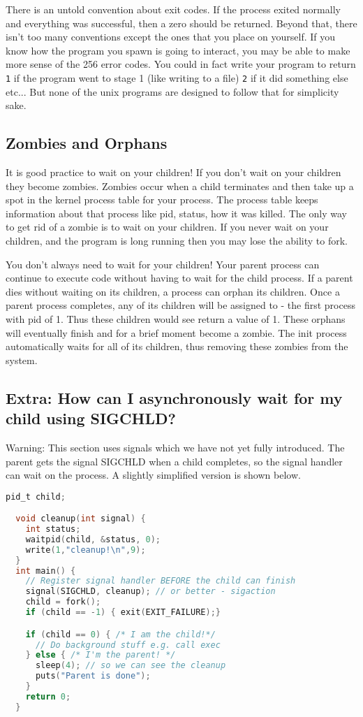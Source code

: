 There is an untold convention about exit codes.
If the process exited normally and everything was successful, then a zero should be returned.
Beyond that, there isn't too many conventions except the ones that you place on yourself.
If you know how the program you spawn is going to interact, you may be able to make more sense of the 256 error codes.
You could in fact write your program to return \texttt{1} if the program went to stage 1 (like writing to a file) \texttt{2} if it did something else etc... But none of the unix programs are designed to follow that for simplicity sake.


\subsection{Zombies and Orphans}

It is good practice to wait on your children!
If you don't wait on your children they become zombies.
Zombies occur when a child terminates and then take up a spot in the kernel process table for your process.
The process table keeps information about that process like pid, status, how it was killed.
The only way to get rid of a zombie is to wait on your children.
If you never wait on your children, and the program is long running then you may lose the ability to fork.

You don't always need to wait for your children!
Your parent process can continue to execute code without having to wait for the child process.
If a parent dies without waiting on its children, a process can orphan its children.
Once a parent process completes, any of its children will be assigned to  - the first process with pid of 1.
Thus these children would see  return a value of 1.
These orphans will eventually finish and for a brief moment become a zombie.
The init process automatically waits for all of its children, thus removing these zombies from the system.

\subsection{Extra: How can I asynchronously wait for my child using SIGCHLD?}

Warning: This section uses signals which we have not yet fully introduced. The parent gets the signal SIGCHLD when a child completes, so the signal handler can wait on the process. A slightly simplified version is shown below.

\begin{lstlisting}[language=C]
  pid_t child;

  void cleanup(int signal) {
    int status;
    waitpid(child, &status, 0);
    write(1,"cleanup!\n",9);
  }
  int main() {
    // Register signal handler BEFORE the child can finish
    signal(SIGCHLD, cleanup); // or better - sigaction
    child = fork();
    if (child == -1) { exit(EXIT_FAILURE);}

    if (child == 0) { /* I am the child!*/
      // Do background stuff e.g. call exec   
    } else { /* I'm the parent! */
      sleep(4); // so we can see the cleanup
      puts("Parent is done");
    }
    return 0;
  } 
\end{lstlisting}

